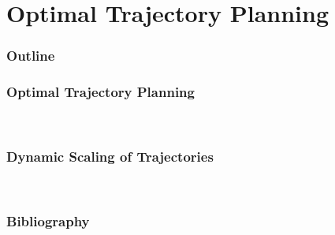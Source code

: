 \documentclass[10pt, aspectratio=169]{beamer}
\theoremstyle{remark}
\theoremstyle{definition}
\begin{document}
\section{Optimal Trajectory Planning}
\begin{frame}
	\frametitle{Outline} %
\end{frame}
\begin{frame}[allowframebreaks]
\frametitle{Optimal Trajectory Planning}

~\cite{vukobratovic1982method}

\end{frame}


\begin{frame}[allowframebreaks]
\frametitle{Dynamic Scaling of Trajectories}

~\cite{hollerbach1983dynamic}

\end{frame}




\begin{frame}[allowframebreaks]
\frametitle{Bibliography}
\printbibliography
\end{frame}
\end{document}
